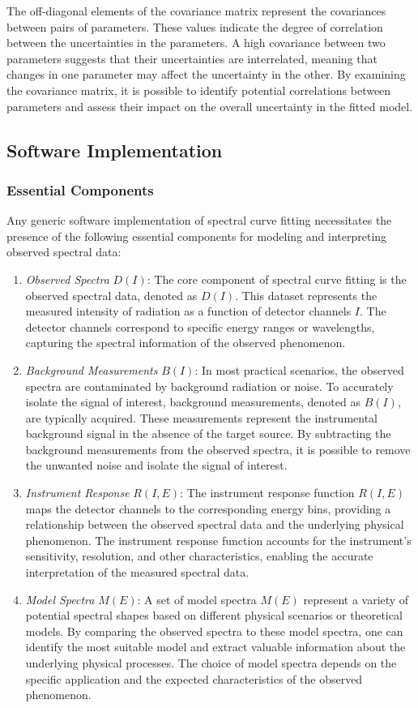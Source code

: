				The off-diagonal elements of the covariance matrix represent the covariances between pairs of parameters. These values indicate the degree of correlation between the uncertainties in the parameters. A high covariance between two parameters suggests that their uncertainties are interrelated, meaning that changes in one parameter may affect the uncertainty in the other. By examining the covariance matrix, it is possible to identify potential correlations between parameters and assess their impact on the overall uncertainty in the fitted model.
			
    	\subsection{Software Implementation}
    		
    		\subsubsection{Essential Components}
    			Any generic software implementation of spectral curve fitting necessitates the presence of the following essential components for modeling and interpreting observed spectral data:
    			\begin{enumerate}
    				\item \textit{Observed Spectra} $D(I)$: The core component of spectral curve fitting is the observed spectral data, denoted as $D(I)$. This dataset represents the measured intensity of radiation as a function of detector channels $I$. The detector channels correspond to specific energy ranges or wavelengths, capturing the spectral information of the observed phenomenon.
    				\item \textit{Background Measurements} $B(I)$: In most practical scenarios, the observed spectra are contaminated by background radiation or noise. To accurately isolate the signal of interest, background measurements, denoted as $B(I)$, are typically acquired. These measurements represent the instrumental background signal in the absence of the target source. By subtracting the background measurements from the observed spectra, it is possible to remove the unwanted noise and isolate the signal of interest.
    				\item \textit{Instrument Response} $R(I,E)$: The instrument response function $R(I,E)$ maps the detector channels to the corresponding energy bins, providing a relationship between the observed spectral data and the underlying physical phenomenon. The instrument response function accounts for the instrument's sensitivity, resolution, and other characteristics, enabling the accurate interpretation of the measured spectral data.
    				\item \textit{Model Spectra} $M(E)$: A set of model spectra $M(E)$ represent a variety of potential spectral shapes based on different physical scenarios or theoretical models. By comparing the observed spectra to these model spectra, one can identify the most suitable model and extract valuable information about the underlying physical processes. The choice of model spectra depends on the specific application and the expected characteristics of the observed phenomenon.
    			\end{enumerate}
    		

